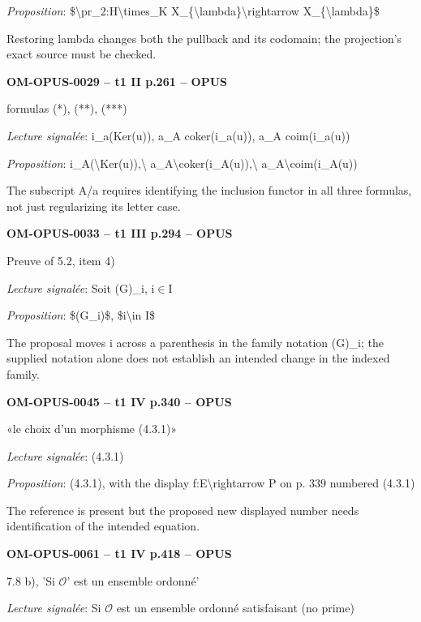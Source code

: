\emph{Proposition}: \$\textbackslash{}pr\_2:H\textbackslash{}times\_K X\_\{\textbackslash{}lambda\}\textbackslash{}rightarrow X\_\{\textbackslash{}lambda\}\$\par
Restoring lambda changes both the pullback and its codomain; the projection's exact source must be checked.\par
\par\noindent\textbf{OM-OPUS-0029 -- t1 II p.261 -- OPUS}\par
formulas (*), (**), (***)\par
\emph{Lecture signalée}: i\_a(Ker(u)), a\_A coker(i\_a(u)), a\_A coim(i\_a(u))\par
\emph{Proposition}: i\_A(\textbackslash{}Ker(u)),\textbackslash{} a\_A\textbackslash{}coker(i\_A(u)),\textbackslash{} a\_A\textbackslash{}coim(i\_A(u))\par
The subscript A/a requires identifying the inclusion functor in all three formulas, not just regularizing its letter case.\par
\par\noindent\textbf{OM-OPUS-0033 -- t1 III p.294 -- OPUS}\par
Preuve of 5.2, item 4)\par
\emph{Lecture signalée}: Soit (G)\_i, i\ensuremath{\in}I\par
\emph{Proposition}: \$(G\_i)\$, \$i\textbackslash{}in I\$\par
The proposal moves i across a parenthesis in the family notation (G)\_i; the supplied notation alone does not establish an intended change in the indexed family.\par
\par\noindent\textbf{OM-OPUS-0045 -- t1 IV p.340 -- OPUS}\par
«le choix d'un morphisme (4.3.1)»\par
\emph{Lecture signalée}: (4.3.1)\par
\emph{Proposition}: (4.3.1), with the display f:E\textbackslash{}rightarrow P on p. 339 numbered (4.3.1)\par
The reference is present but the proposed new displayed number needs identification of the intended equation.\par
\par\noindent\textbf{OM-OPUS-0061 -- t1 IV p.418 -- OPUS}\par
7.8 b), 'Si \ensuremath{𝒪}' est un ensemble ordonné'\par
\emph{Lecture signalée}: Si \ensuremath{𝒪} est un ensemble ordonné satisfaisant (no prime)\par
